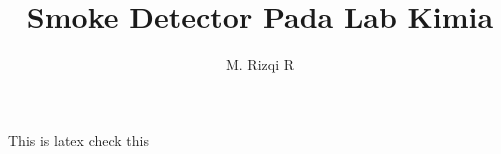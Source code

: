 \documentclass{article}
\author{M. Rizqi R}
\date{}
\title{Smoke Detector Pada Lab Kimia}
\begin{document}
    \maketitle
    This is latex check this
\end{document}

